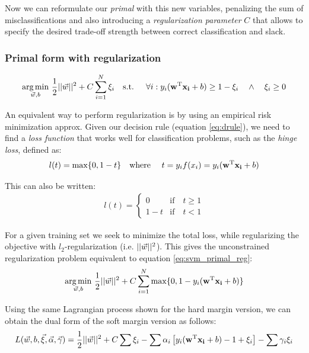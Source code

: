 Now we can reformulate our \emph{primal} with this new variables, penalizing the sum of misclassifications and also introducing a \emph{regularization parameter} $C$ that allows to specify the desired trade-off strength between correct classification and slack.

\subsubsection*{Primal form with regularization}
\begin{align}\label{eq:svm_primal_reg} 
    \underset{\vec{w}, b}{\text{arg} \min}\ \frac{1}{2} ||\vec{w}||^2 + C \sum_{i=1}^{N} \xi_i
    \text{\quad s.t. \quad} 
    \forall i : y_i (\mathbf{w}^{\text{T}} \mathbf{x_i} + b) \ge 1 - \xi_i \quad \land \quad \xi_i \ge 0
\end{align}

An equivalent way to perform regularization is by using an empirical risk mini\-mization approx. Given our decision rule (equation \ref{eq:drule}), we need to find a \emph{loss function} that works well for classification problems, such as the \emph{hinge loss}, defined as:
\begin{align}
    l(t) = \max \{0, 1 - t\} \text{\quad where \quad} t = y_if(x_i) = y_i (\mathbf{w}^{\text{T}} \mathbf{x_i} + b)
\end{align}

This can also be written:
\begin{align*}
    l(t) = \left\{
        \begin{array}{ll}
            0   & \mbox{if} \quad t \ge 1 \\
            1-t & \mbox{if} \quad t < 1  
        \end{array}
    \right.
\end{align*}

For a given training set we seek to minimize the total loss, while regularizing the objective with $l_2$-regularization (i.e. $||\vec{w}||^2$). This gives the unconstrained reg\-u\-lar\-iza\-tion problem equivalent to equation \ref{eq:svm_primal_reg}:
\begin{align}
    \underset{\vec{w}, b}{\text{arg} \min}\ \frac{1}{2} ||\vec{w}||^2 + C \sum_{i=1}^{N} \max \{0, 1 -  y_i (\mathbf{w}^{\text{T}} \mathbf{x_i} + b)\}
\end{align}

Using the same Lagrangian process shown for the hard margin version, we can obtain the dual form of the soft margin version as follows:
\begin{align*}
    L(\vec{w}, b, \vec{\xi}, \vec{\alpha}, \vec{\gamma}) = 
    \frac{1}{2} ||\vec{w}||^2 + C \sum \xi_i
    - \sum \alpha_i \left[ y_i (\mathbf{w}^{\text{T}} \mathbf{x_i} + b) - 1 + \xi_i \right]
    - \sum \gamma_i \xi_i
\end{align*}

